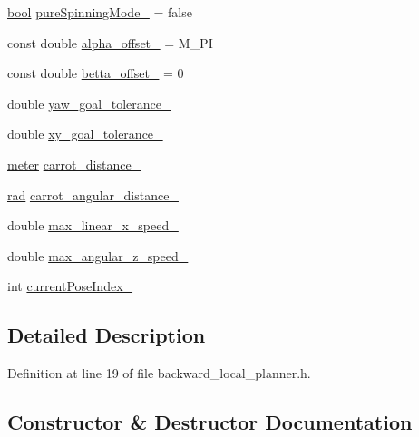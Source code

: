 \begin{DoxyCompactItemize}
\hyperlink{classbool}{bool} \hyperlink{classbackward__local__planner_1_1BackwardLocalPlanner_a04a769cc9f1ae5170b06c92edfbb80f6}{pure\+Spinning\+Mode\+\_\+} = false
\item 
const double \hyperlink{classbackward__local__planner_1_1BackwardLocalPlanner_a5897f084e4829cb5edd2f1fce5fe2546}{alpha\+\_\+offset\+\_\+} = M\+\_\+\+PI
\item 
const double \hyperlink{classbackward__local__planner_1_1BackwardLocalPlanner_a3eeb4150cba2ff54d177b9a51c6c17cb}{betta\+\_\+offset\+\_\+} = 0
\item 
double \hyperlink{classbackward__local__planner_1_1BackwardLocalPlanner_ad402f445e3358e233e4cbcc31def86c7}{yaw\+\_\+goal\+\_\+tolerance\+\_\+}
\item 
double \hyperlink{classbackward__local__planner_1_1BackwardLocalPlanner_accf76d17d29c3b798fc4ec7841273b7c}{xy\+\_\+goal\+\_\+tolerance\+\_\+}
\item 
\hyperlink{backward__local__planner_8h_ab6024a26b088c11b8a5218a469ae5a57}{meter} \hyperlink{classbackward__local__planner_1_1BackwardLocalPlanner_a969063a163a35ad5c234d03a77528657}{carrot\+\_\+distance\+\_\+}
\item 
\hyperlink{backward__local__planner_8h_a640effbe91ae9b25d698a883a9e80d96}{rad} \hyperlink{classbackward__local__planner_1_1BackwardLocalPlanner_adcfcc43316a79db09f6c09b8e2a482b6}{carrot\+\_\+angular\+\_\+distance\+\_\+}
\item 
double \hyperlink{classbackward__local__planner_1_1BackwardLocalPlanner_a649fccd71e53ae248ee2f51506e381d2}{max\+\_\+linear\+\_\+x\+\_\+speed\+\_\+}
\item 
double \hyperlink{classbackward__local__planner_1_1BackwardLocalPlanner_a737a0163525aae9afb44bd17f9e013ad}{max\+\_\+angular\+\_\+z\+\_\+speed\+\_\+}
\item 
int \hyperlink{classbackward__local__planner_1_1BackwardLocalPlanner_af2485562720c0ce3c895debdbdfc89f3}{current\+Pose\+Index\+\_\+}
\end{DoxyCompactItemize}


\subsection{Detailed Description}


Definition at line 19 of file backward\+\_\+local\+\_\+planner.\+h.



\subsection{Constructor \& Destructor Documentation}
